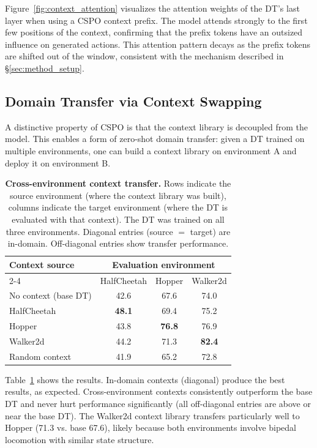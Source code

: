 \documentclass{article}
\newcommand{\cspo}{\textsc{CSPO}}
\begin{document}
Figure~\ref{fig:context_attention} visualizes the attention weights of the DT's last layer when using a \cspo{} context prefix. The model attends strongly to the first few positions of the context, confirming that the prefix tokens have an outsized influence on generated actions. This attention pattern decays as the prefix tokens are shifted out of the window, consistent with the mechanism described in \S\ref{sec:method_setup}.

\subsection{Domain Transfer via Context Swapping}
\label{sec:transfer}

A distinctive property of \cspo{} is that the context library is decoupled from the model. This enables a form of zero-shot domain transfer: given a DT trained on multiple environments, one can build a context library on environment A and deploy it on environment B.

\begin{table}[t]
\centering
\caption{\textbf{Cross-environment context transfer.} Rows indicate the source environment (where the context library was built), columns indicate the target environment (where the DT is evaluated with that context). The DT was trained on all three environments. Diagonal entries (source $=$ target) are in-domain. Off-diagonal entries show transfer performance.}
\label{tab:transfer}
\vspace{0.5em}
\begin{tabular}{l c c c}
\toprule
\multirow{2}{*}{\textbf{Context source}} & \multicolumn{3}{c}{\textbf{Evaluation environment}} \\
\cmidrule(lr){2-4}
& HalfCheetah & Hopper & Walker2d \\
\midrule
No context (base DT) & 42.6 & 67.6 & 74.0 \\
\midrule
HalfCheetah & \textbf{48.1} & 69.4 & 75.2 \\
Hopper & 43.8 & \textbf{76.8} & 76.9 \\
Walker2d & 44.2 & 71.3 & \textbf{82.4} \\
\midrule
Random context & 41.9 & 65.2 & 72.8 \\
\bottomrule
\end{tabular}
\end{table}

Table~\ref{tab:transfer} shows the results. In-domain contexts (diagonal) produce the best results, as expected. Cross-environment contexts consistently outperform the base DT and never hurt performance significantly (all off-diagonal entries are above or near the base DT). The Walker2d context library transfers particularly well to Hopper (71.3 vs. base 67.6), likely because both environments involve bipedal locomotion with similar state structure.
\end{document}

